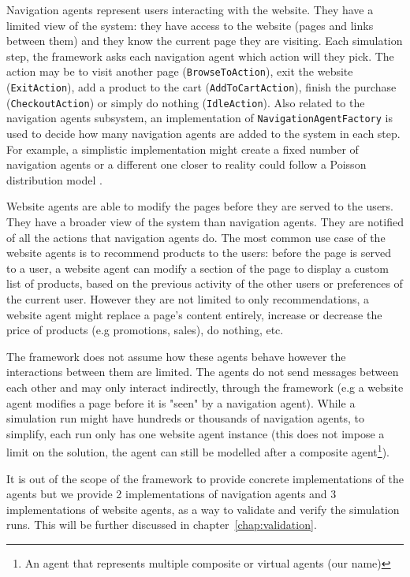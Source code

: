 Navigation agents represent users interacting with the website. They have a 
limited view of the system: they have access to the website (pages and links 
between them) and they know the current page they are visiting. Each simulation 
step, the framework asks each navigation agent which action will they pick. The 
action may be to visit another page (\texttt{BrowseToAction}), exit the 
website (\texttt{ExitAction}), add a product to the cart 
(\texttt{AddToCartAction}), finish the purchase (\texttt{CheckoutAction}) 
or simply do nothing (\texttt{IdleAction}). Also related to the navigation 
agents subsystem, an implementation of \texttt{NavigationAgentFactory} is 
used to decide how many navigation agents are added to the system in each step. 
For example, a simplistic implementation might create a fixed number of 
navigation agents or a different one closer to reality could follow a Poisson 
distribution model \cite{gunduz2003poisson}.

Website agents are able to modify the pages before they are served to the 
users. They have a broader view of the system than navigation agents. They are 
notified of all the actions that navigation agents do. The most common use 
case of the website agents is to recommend products to the users: before the 
page is served to a user, a website agent can modify a section of the page to 
display a custom list of products, based on the previous activity of the other 
users or preferences of the current user. However they are not limited to only 
recommendations, a website agent might replace a page's content entirely, 
increase or decrease the price of products (e.g promotions, sales), do nothing, 
etc.

The framework does not assume how these agents behave however the interactions 
between them are limited. The agents do not send messages between each other 
and may only interact indirectly, through the framework (e.g a website agent 
modifies a page before it is "seen" by a navigation agent). While a simulation 
run might have hundreds or thousands of navigation agents, to simplify, each 
run only has one website agent instance (this does not impose a limit on the 
solution, the agent can still be modelled after a composite agent\footnote{An 
    agent that represents multiple composite or virtual agents (our name)}).

It is out of the scope of the framework to provide concrete implementations of 
the agents but we provide 2 implementations of navigation agents and 3 
implementations of website agents, as a way to validate and verify the 
simulation runs. This will be further discussed in 
chapter~\ref{chap:validation}.

